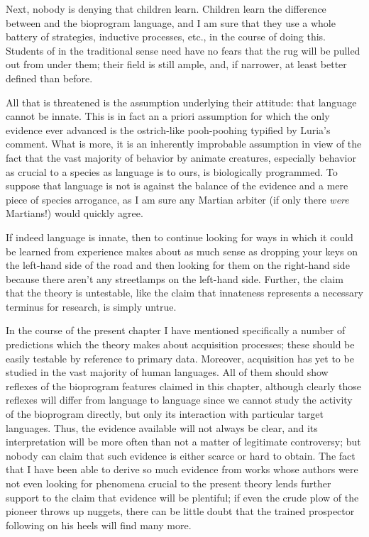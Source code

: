 Next, nobody is denying that children learn. Children   learn the difference between  and the bioprogram language, and I am sure that they use a whole battery of  strategies, inductive processes, etc., in the course of doing this. Students of  in the traditional sense need have no fears that the rug will be pulled out from under them; their field is still ample, and, if narrower, at least better defined than before.

All that is threatened is the assumption underlying their attitude: that language cannot be innate. This is in fact an a priori assumption for which the only evidence ever advanced is the ostrich-like pooh-poohing typified by Luria's comment. What is more, it is an inherently improbable assumption in view of the fact that the vast majority of behavior by animate creatures, especially behavior as crucial to a species as language is to ours, is biologically programmed. To suppose that language is not is against the balance of the evidence and a mere piece of species arrogance, as I am sure any Martian arbiter (if only there \textit{were} Martians!) would quickly agree.

If indeed language is innate, then to continue looking for ways in which it could be learned from experience makes about as much sense as dropping your keys on the left-hand side of the road and then looking for them on the right-hand side because there aren't any streetlamps on the left-hand side. Further, the claim that the theory is untestable, like the claim that innateness represents a necessary terminus for research, is simply untrue.


In the course of the present chapter I have mentioned specifically a number of predictions which the theory makes about acquisition processes; these should be easily testable by reference to primary data. Moreover, acquisition has yet to be studied in the vast majority of human languages. All of them should show reflexes of the bioprogram features claimed in this chapter, although clearly those reflexes will differ from language to language since we cannot study the activity of the bioprogram directly, but only its interaction with particular target languages. Thus, the evidence available will not always be clear, and its interpretation will be more often than not a matter of legitimate controversy; but nobody can claim that such evidence is either scarce or hard to obtain. The fact that I have been able to derive so much evidence from works whose authors were not even looking for phenomena crucial to the present theory lends further support to the claim that evidence will be plentiful; if even the crude plow of the pioneer throws up nuggets, there can be little doubt that the trained prospector following on his heels will find many more.

